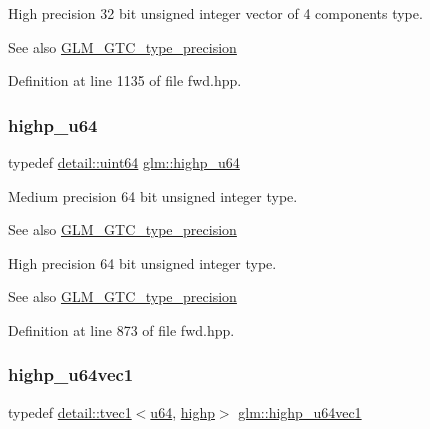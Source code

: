 High precision 32 bit unsigned integer vector of 4 components type. \begin{DoxySeeAlso}{See also}
\hyperlink{group__gtc__type__precision}{G\+L\+M\+\_\+\+G\+T\+C\+\_\+type\+\_\+precision} 
\end{DoxySeeAlso}


Definition at line 1135 of file fwd.\+hpp.

\mbox{\label{group__gtc__type__precision_ga6006ea883d3c0491791650b2fb84de39}} 
\subsubsection{\texorpdfstring{highp\+\_\+u64}{highp\_u64}}
{\footnotesize\ttfamily typedef \hyperlink{namespaceglm_1_1detail_adec4b19bf4982125e122db2fe03c5810}{detail\+::uint64} \hyperlink{group__gtc__type__precision_ga6006ea883d3c0491791650b2fb84de39}{glm\+::highp\+\_\+u64}}

Medium precision 64 bit unsigned integer type. \begin{DoxySeeAlso}{See also}
\hyperlink{group__gtc__type__precision}{G\+L\+M\+\_\+\+G\+T\+C\+\_\+type\+\_\+precision}
\end{DoxySeeAlso}
High precision 64 bit unsigned integer type. \begin{DoxySeeAlso}{See also}
\hyperlink{group__gtc__type__precision}{G\+L\+M\+\_\+\+G\+T\+C\+\_\+type\+\_\+precision} 
\end{DoxySeeAlso}


Definition at line 873 of file fwd.\+hpp.

\mbox{\label{group__gtc__type__precision_gab48ca217e1d1cc9aac3d9f037493ae7e}} 
\subsubsection{\texorpdfstring{highp\+\_\+u64vec1}{highp\_u64vec1}}
{\footnotesize\ttfamily typedef \hyperlink{structglm_1_1detail_1_1tvec1}{detail\+::tvec1}$<$\hyperlink{group__gtc__type__precision_ga71cedd4972f9cb1a5e14dfe5ab83ecd7}{u64}, \hyperlink{namespaceglm_a0f04f086094c747d227af4425893f545ac6f7eab42eacbb10d59a58e95e362074}{highp}$>$ \hyperlink{group__gtc__type__precision_gab48ca217e1d1cc9aac3d9f037493ae7e}{glm\+::highp\+\_\+u64vec1}}


